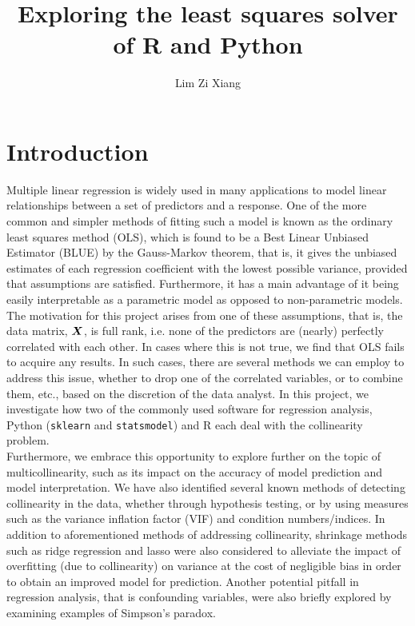 \documentclass[12pt]{article}
\title{Exploring the least squares solver of R and Python}
\author{Lim Zi Xiang}
\date{}
\begin{document}
	\tableofcontents
	\pagebreak
	
	\section{Introduction}
	
	Multiple linear regression is widely used in many applications to model linear relationships between a set of predictors and a response. One of the more common and simpler methods of fitting such a model is known as the ordinary least squares method (OLS), which is found to be a Best Linear Unbiased Estimator (BLUE) by the Gauss-Markov theorem, that is, it gives the unbiased estimates of each regression coefficient with the lowest possible variance, provided that assumptions are satisfied. Furthermore, it has a main advantage of it being easily interpretable as a parametric model as opposed to non-parametric models.\\
	
	\setlength\parindent{24pt} The motivation for this project arises from one of these assumptions, that is, the data matrix, $\boldsymbol{X}$, is full rank, i.e. none of the predictors are (nearly) perfectly correlated with each other. In cases where this is not true, we find that OLS fails to acquire any results. In such cases, there are several methods we can employ to address this issue, whether to drop one of the correlated variables, or to combine them, etc., based on the discretion of the data analyst. In this project, we investigate how two of the commonly used software for regression analysis, Python (\texttt{sklearn} and \texttt{statsmodel}) and R each deal with the collinearity problem.\\
	
	Furthermore, we embrace this opportunity to explore further on the topic of multicollinearity, such as its impact on the accuracy of model prediction and model interpretation. We have also identified several known methods of detecting collinearity in the data, whether through hypothesis testing, or by using measures such as the variance inflation factor (VIF) and condition numbers/indices. In addition to aforementioned methods of addressing collinearity, shrinkage methods such as ridge regression and lasso were also considered to alleviate the impact of overfitting (due to collinearity) on variance at the cost of negligible bias in order to obtain an improved model for prediction. Another potential pitfall in regression analysis, that is confounding variables, were also briefly explored by examining examples of Simpson's paradox.\\
	
\end{document}
